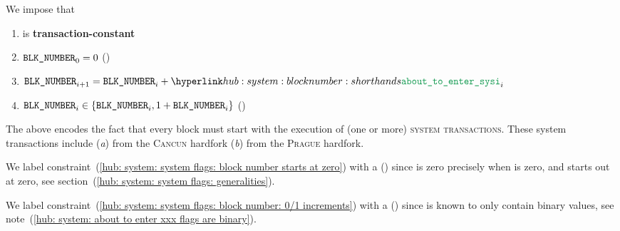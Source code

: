 We impose that
\begin{enumerate}
	\item \blockNumber{} is \textbf{transaction-constant}
	\item \label{hub: system: system flags: block number starts at zero} $\texttt{BLK\_NUMBER} _{0} = 0$ (\sanityCheck)
	\item $\blockNumber _{i + 1} = \blockNumber _{i} + \aboutToEnterSystemInit _{i}$
	\item \label{hub: system: system flags: block number: 0/1 increments} $\texttt{BLK\_NUMBER} _{i} \in \{ \texttt{BLK\_NUMBER} _{i}, 1 + \texttt{BLK\_NUMBER} _{i} \}$ (\sanityCheck)
\end{enumerate}
\saNote{} \label{hub: system: system flags: block number increments and initial system transactions}
The above encodes the fact that every block must start with the execution of (one or more) \textsc{system transactions}.
These system transactions include
(\emph{a}) \cite{EIP-4788} from the \textsc{Cancun} hardfork
(\emph{b}) \cite{EIP-2935} from the \textsc{Prague} hardfork.

\saNote{}
We label constraint~(\ref {hub: system: system flags: block number starts at zero}) with a (\sanityCheck) since
\blockNumber{} is zero precisely when \flagSum{} is zero, and
\flagSum{} starts out at zero,
see section~(\ref{hub: system: system flags: generalities}).

\saNote{}
We label constraint~(\ref{hub: system: system flags: block number: 0/1 increments}) with a (\sanityCheck) since
\aboutToEnterSystemInit{} is known to only contain binary values,
see note~(\ref{hub: system: about to enter xxx flags are binary}).
